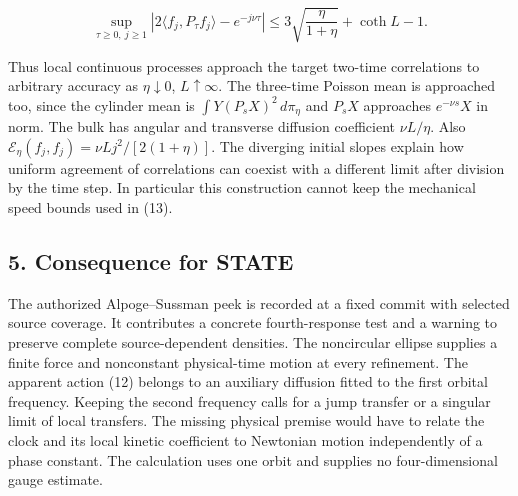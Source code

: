\documentclass[11pt,a4paper]{article}
\begin{document}
\[
 \sup_{\tau\ge0,\ j\ge1}
 \left|2\langle f_j,P_\tau f_j\rangle-e^{-j\nu\tau}\right|
 \le 3\sqrt{\frac{\eta}{1+\eta}}+\coth L-1 .                     \tag{15}
\]

Thus local continuous processes approach the target two-time
correlations to arbitrary accuracy as \(\eta\downarrow0\), \(L\uparrow
\infty\). The three-time Poisson mean is approached too, since the
cylinder mean is \(\int Y(P_sX)^2\,d\pi_\eta\) and \(P_sX\) approaches
\(e^{-\nu s}X\) in norm. The bulk has angular and transverse diffusion
coefficient \(\nu L/\eta\). Also \(\mathcal E_\eta(f_j,f_j)=\nu
Lj^2/[2(1+\eta)]\). The diverging initial slopes explain how uniform
agreement of correlations can coexist with a different limit after
division by the time step. In particular this construction cannot keep
the mechanical speed bounds used in (13).

\subsection{5. Consequence for STATE}\label{consequence-for-state}

The authorized Alpoge--Sussman peek is recorded at a fixed commit with
selected source coverage. It contributes a concrete fourth-response test
and a warning to preserve complete source-dependent densities. The
noncircular ellipse supplies a finite force and nonconstant
physical-time motion at every refinement. The apparent action (12)
belongs to an auxiliary diffusion fitted to the first orbital frequency.
Keeping the second frequency calls for a jump transfer or a singular
limit of local transfers. The missing physical premise would have to
relate the clock and its local kinetic coefficient to Newtonian motion
independently of a phase constant. The calculation uses one orbit and
supplies no four-dimensional gauge estimate.
\end{document}
